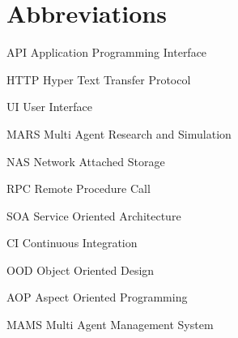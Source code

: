     \newcommand{\abbrlabel}[1]{\makebox[3cm][l]{\textbf{#1}\ }}
\newenvironment{abbreviations}{\begin{list}{}{\renewcommand{\makelabel}{\abbrlabel}}}{\end{list}}
%

\newpage
\chapter*{Abbreviations}
\begin{abbreviations}
\item[API] Application Programming Interface
\item[HTTP] Hyper Text Transfer Protocol
\item[UI] User Interface
\item[MARS] Multi Agent Research and Simulation
\item[NAS] Network Attached Storage
\item[RPC] Remote Procedure Call
\item[SOA] Service Oriented Architecture
\item[CI] Continuous Integration
\item[OOD] Object Oriented Design
\item[AOP] Aspect Oriented Programming
\item[MAMS] Multi Agent Management System
\end{abbreviations}
%